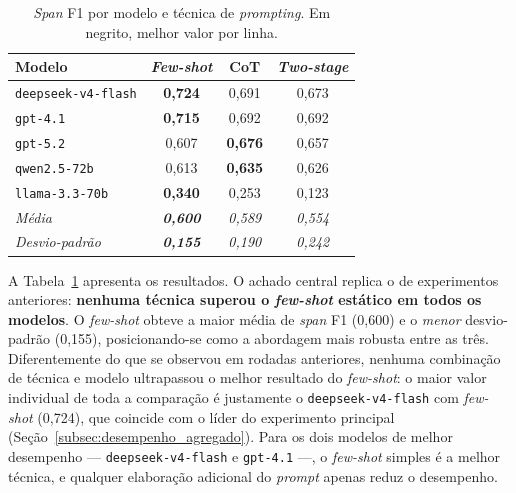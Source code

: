 \begin{table}[ht]
    \centering
    \caption{\textit{Span} F1 por modelo e técnica de \textit{prompting}. Em negrito, melhor valor por linha.}
    \label{tab:tecnicas_prompting}
    \small
    \begin{tabular}{lccc}
        \hline
        \textbf{Modelo} & \textbf{\textit{Few-shot}} & \textbf{CoT} & \textbf{\textit{Two-stage}} \\
        \hline
        \texttt{deepseek-v4-flash}     & \textbf{0,724} & 0,691 & 0,673 \\
        \texttt{gpt-4.1}               & \textbf{0,715} & 0,692 & 0,692 \\
        \texttt{gpt-5.2}               & 0,607 & \textbf{0,676} & 0,657 \\
        \texttt{qwen2.5-72b}           & 0,613 & \textbf{0,635} & 0,626 \\
        \texttt{llama-3.3-70b}         & \textbf{0,340} & 0,253 & 0,123 \\
        \hline
        \textit{Média}        & \textit{\textbf{0,600}} & \textit{0,589} & \textit{0,554} \\
        \textit{Desvio-padrão} & \textit{\textbf{0,155}} & \textit{0,190} & \textit{0,242} \\
        \hline
    \end{tabular}
\end{table}

A Tabela~\ref{tab:tecnicas_prompting} apresenta os resultados. O achado central replica o de experimentos anteriores: \textbf{nenhuma técnica superou o \textit{few-shot} estático em todos os modelos}. O \textit{few-shot} obteve a maior média de \textit{span} F1 (0,600) e o \emph{menor} desvio-padrão (0,155), posicionando-se como a abordagem mais robusta entre as três. Diferentemente do que se observou em rodadas anteriores, nenhuma combinação de técnica e modelo ultrapassou o melhor resultado do \textit{few-shot}: o maior valor individual de toda a comparação é justamente o \texttt{deepseek-v4-flash} com \textit{few-shot} (0,724), que coincide com o líder do experimento principal (Seção~\ref{subsec:desempenho_agregado}). Para os dois modelos de melhor desempenho --- \texttt{deepseek-v4-flash} e \texttt{gpt-4.1} ---, o \textit{few-shot} simples é a melhor técnica, e qualquer elaboração adicional do \textit{prompt} apenas reduz o desempenho.

